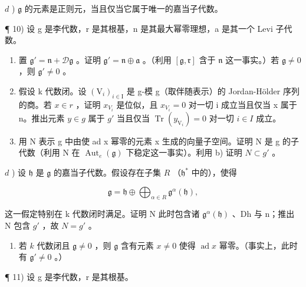 \(d\) ) \(\mathfrak{g}\) 的元素是正则元，当且仅当它属于唯一的嘉当子代数。

¶ 10) 设 g 是李代数，r 是其根基，n 是其最大幂零理想，a 是其一个 Levi 子代数。

\begin{enumerate}
\def\labelenumi{\alph{enumi})}
\item
  置 \(\mathfrak{g}' = \mathfrak{n} + \mathcal{D}\mathfrak{g}\) 。证明 \(\mathfrak{g}' = \mathfrak{n} \oplus \mathfrak{a}\) 。（利用 \([\mathfrak{g}, \mathfrak{r}]\) 含于 \(\mathfrak{n}\) 这一事实。）若 \(\mathfrak{g} \neq 0\) ，则 \(\mathfrak{g}' \neq 0\) 。
\item
  假设 k 代数闭。设 \((\mathrm{V}_{i})_{i\in\mathrm{I}}\) 是 g-模 g（取伴随表示）的 Jordan-Hölder 序列的商。若 \(x\in r\) ，证明 \(x_{V_{i}}\) 是位似，且 \(x_{V_{i}}=0\) 对一切 i 成立当且仅当 x 属于 n。推出元素 \(y\in g\) 属于 \(g'\) 当且仅当 \(\operatorname{Tr}(y_{\mathrm{V}_{i}})=0\) 对一切 \(i\in I\) 成立。
\item
  用 N 表示 g 中由使 ad x 幂零的元素 x 生成的向量子空间。证明 N 是 g 的子代数（利用 N 在 \(\operatorname{Aut}_{e}(\mathfrak{g})\) 下稳定这一事实）。利用 b) 证明 \(N \subset g'\) 。
\end{enumerate}

\(d\) ) 设 \(\mathfrak{h}\) 是 \(\mathfrak{g}\) 的嘉当子代数。假设存在子集 \(R\) （\(\mathfrak{h}^*\) 中的），使得

\[
\mathfrak {g} = \mathfrak {h} \oplus \bigoplus_ {\alpha \in R} \mathfrak {g} ^ {\alpha} (\mathfrak {h}),
\]

这一假定特别在 k 代数闭时满足。证明 N 此时包含诸 \(\mathfrak{g}^{\alpha}(\mathfrak{h})\) 、Dh 与 n；推出 N 包含 \(g'\) ，故 \(N = g'\) 。

\begin{enumerate}
\def\labelenumi{\alph{enumi})}
\setcounter{enumi}{4}
\tightlist
\item
  若 \(k\) 代数闭且 \(\mathfrak{g} \neq 0\) ，则 \(\mathfrak{g}\) 含有元素 \(x \neq 0\) 使得 \(\operatorname{ad} x\) 幂零。（事实上，此时有 \(\mathfrak{g}' \neq 0\) 。）
\end{enumerate}

¶ 11) 设 g 是李代数，r 是其根基。

